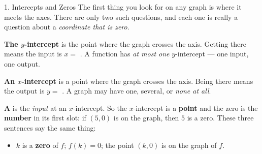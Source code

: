 \documentclass[10pt]{article}
\begin{document}
\vspace{0.10in}

\boxguard[30]
\begin{notesbox}{1. Intercepts and Zeros}
\small
The first thing you look for on any graph is where it meets the axes. There are only two such
questions, and each one is really a question about a \emph{coordinate that is zero}.

\vspace{4pt}
\textbf{The $y$-intercept} is the point where the graph crosses the \blank{2.4cm} axis. Getting
there means the input is $x=$ \blank{0.9cm}. A function has \emph{at most one} $y$-intercept --- one
input, one output.

\vspace{2pt}
\textbf{An $x$-intercept} is a point where the graph crosses the \blank{2.4cm} axis. Being there
means the output is $y=$ \blank{0.9cm}. A graph may have one, several, or \emph{none at all}.

\vspace{2pt}
\textbf{A \blank{2.2cm}} is the \emph{input} at an $x$-intercept. So the $x$-intercept is a
\textbf{point} and the zero is the \textbf{number} in its first slot: if $(5,0)$ is on the graph,
then $5$ is a zero. These three sentences say the same thing:
\begin{itemize}[leftmargin=1.3em, itemsep=1pt, topsep=3pt]
  \item $k$ is a \textbf{zero} of $f$; \quad $f(k)=0$; \quad the point $(k,0)$ is on the graph of $f$.
\end{itemize}


\end{notesbox}
\end{document}
